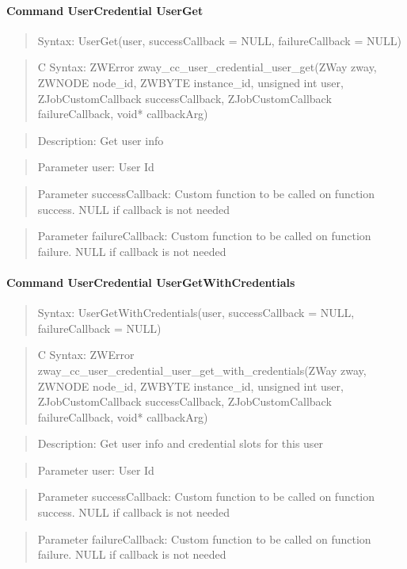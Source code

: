 \paragraph{Command UserCredential UserGet}
\begin{quote}Syntax: UserGet(user, successCallback = NULL, failureCallback = NULL)\end{quote}
\begin{quote}C Syntax: ZWError zway\_cc\_user\_credential\_user\_get(ZWay zway, ZWNODE node\_id, ZWBYTE instance\_id, unsigned int user, ZJobCustomCallback successCallback, ZJobCustomCallback failureCallback, void* callbackArg)\end{quote}
\begin{quote}Description: Get user info\end{quote}
\begin{quote}Parameter user: User Id\end{quote}
\begin{quote}Parameter successCallback: Custom function to be called on function success. NULL if callback is not needed\end{quote}
\begin{quote}Parameter failureCallback: Custom function to be called on function failure. NULL if callback is not needed\end{quote}


\paragraph{Command UserCredential UserGetWithCredentials}
\begin{quote}Syntax: UserGetWithCredentials(user, successCallback = NULL, failureCallback = NULL)\end{quote}
\begin{quote}C Syntax: ZWError zway\_cc\_user\_credential\_user\_get\_with\_credentials(ZWay zway, ZWNODE node\_id, ZWBYTE instance\_id, unsigned int user, ZJobCustomCallback successCallback, ZJobCustomCallback failureCallback, void* callbackArg)\end{quote}
\begin{quote}Description: Get user info and credential slots for this user\end{quote}
\begin{quote}Parameter user: User Id\end{quote}
\begin{quote}Parameter successCallback: Custom function to be called on function success. NULL if callback is not needed\end{quote}
\begin{quote}Parameter failureCallback: Custom function to be called on function failure. NULL if callback is not needed\end{quote}


